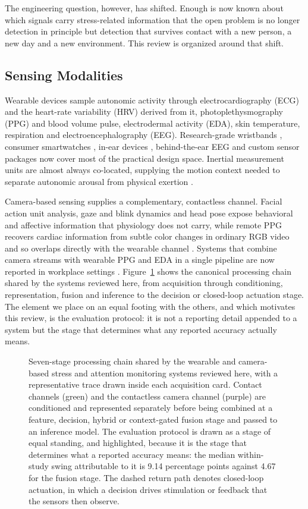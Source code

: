 The engineering question, however, has shifted. Enough is now known about which signals carry
stress-related information that the open problem is no longer detection in principle but
detection that survives contact with a new person, a new day and a new environment. This
review is organized around that shift.

\subsection{Sensing Modalities}
Wearable devices sample autonomic activity through electrocardiography (ECG) and the
heart-rate variability (HRV) derived from it, photoplethysmography (PPG) and blood volume
pulse, electrodermal activity (EDA), skin temperature, respiration and
electroencephalography (EEG). Research-grade wristbands \cite{r12,r19}, consumer smartwatches
\cite{r13,r25}, in-ear devices \cite{r43}, behind-the-ear EEG \cite{r31} and custom sensor
packages \cite{r14,r108} now cover most of the practical design space. Inertial measurement
units are almost always co-located, supplying the motion context needed to separate
autonomic arousal from physical exertion \cite{r19,r79}.

Camera-based sensing supplies a complementary, contactless channel. Facial action unit
analysis, gaze and blink dynamics and head pose expose behavioral and affective information
that physiology does not carry, while remote PPG recovers cardiac information from subtle
color changes in ordinary RGB video and so overlaps directly with the wearable channel
\cite{r16}. Systems that combine camera streams with wearable PPG and EDA in a single
pipeline are now reported in workplace settings \cite{r17}. Figure~\ref{fig:block} shows the
canonical processing chain shared by the systems reviewed here, from acquisition through
conditioning, representation, fusion and inference to the decision or closed-loop actuation
stage. The element we place on an equal footing with the others, and which motivates this
review, is the evaluation protocol: it is not a reporting detail appended to a system but the
stage that determines what any reported accuracy actually means.

\begin{figure}[!htbp]
\centering
\resizebox{\textwidth}{!}{}
\caption{Seven-stage processing chain shared by the wearable and camera-based stress and
attention monitoring systems reviewed here, with a representative trace drawn inside each
acquisition card. Contact channels (green) and the contactless camera channel (purple) are
conditioned and represented separately before being combined at a feature, decision, hybrid
or context-gated fusion stage and passed to an inference model. The evaluation protocol is
drawn as a stage of equal standing, and highlighted, because it is the stage that determines
what a reported accuracy means: the median within-study swing attributable to it is 9.14
percentage points against 4.67 for the fusion stage. The dashed return path denotes
closed-loop actuation, in which a decision drives stimulation or feedback that the sensors
then observe.}
\label{fig:block}
\end{figure}

